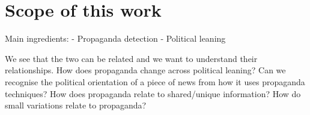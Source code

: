 \section{Scope of this work}

Main ingredients:
- Propaganda detection
- Political leaning

We see that the two can be related and we want to understand their relationships.
How does propaganda change across political leaning?
Can we recognise the political orientation of a piece of news from how it uses propaganda techniques?
How does propaganda relate to shared/unique information? How do small variations relate to propaganda?
